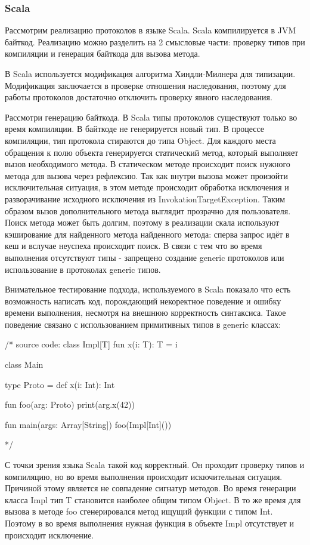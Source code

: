 \subsubsection{Scala}
Рассмотрим реализацию протоколов в языке Scala. Scala компилируется в JVM байткод. Реализацию можно разделить на 2 смысловые части: проверку типов при компиляции и генерация байткода для вызова метода.

В Scala используется модификация алгоритма Хиндли-Милнера для типизации. Модификация заключается в проверке отношения наследования, поэтому для работы протоколов достаточно отключить проверку явного наследования.

Рассмотри генерацию байткода. В Scala типы протоколов существуют только во время компиляции. В байткоде не генерируется новый тип. В процессе компиляции, тип протокола стираются до типа Object. Для каждого места обращения к полю объекта генерируется статический метод, который выполняет вызов необходимого метода. В статическом методе происходит поиск нужного метода для вызова через рефлексию. Так как внутри вызова может произойти исключительная ситуация, в этом методе происходит обработка исключения и разворачивание исходного исключения из InvokationTargetException. Таким образом вызов дополнительного метода выглядит прозрачно для пользователя. Поиск метода может быть долгим, поэтому в реализации скала используют кэширование для найденного метода найденного метода: сперва запрос идёт в кеш и вслучае неуспеха происходит поиск. В связи с тем что во время выполнения отсутствуют типы - запрещено создание generic протоколов или использование в протоколах generic типов.

Внимательное тестирование подхода, используемого в Scala показало что есть возможность написать код, порождающий некоректное поведение и ошибку времени выполнения, несмотря на внешнюю корректность синтаксиса. Такое поведение связано с использованием примитивных типов в generic классах:

/*
source code:
class Impl[T] {
	fun x(i: T): T = i
}

class Main {
	type Proto = { def x(i: Int): Int }

	fun foo(arg: Proto) {
		print(arg.x(42))
	}

	fun main(args: Array[String]) {
		foo(Impl[Int]())
	}
}
*/

С точки зрения языка Scala такой код корректный. Он проходит проверку типов и компиляцию, но во время выполнения происходит искючительная ситуация. Причиной этому является не совпадение сигнатур методов. Во время генерации класса Impl тип T становится наиболее общим типом Object. В то же время для вызова в методе foo сгенерировался метод ищущий функции с типом Int. Поэтому в во время выполнения нужная функция в объекте Impl отсутствует и происходит исключение.
